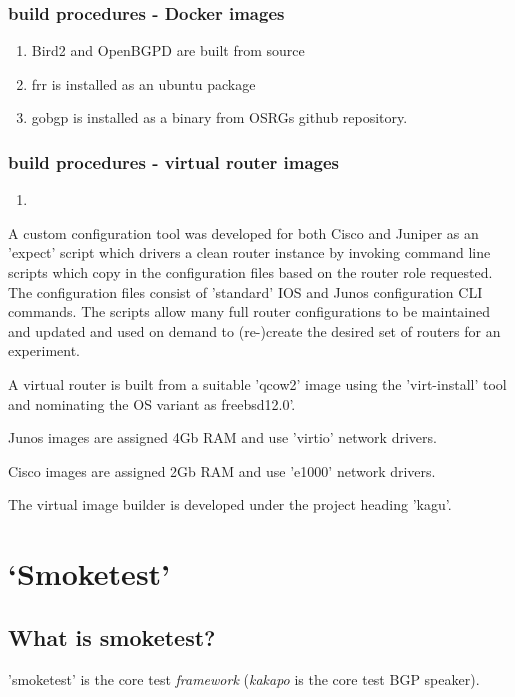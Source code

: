 \subsubsection{build procedures - Docker images}

\begin{enumerate}
\item Bird2 and OpenBGPD are built from source
\item frr is installed as an ubuntu package
\item gobgp is installed as a binary from OSRGs github repository.
\end{enumerate}

\subsubsection{build procedures - virtual router images}

\begin{enumerate}
\item <reference source file directory>
\end{enumerate}

A custom configuration tool was developed for both Cisco and Juniper as an 'expect' script which drivers a clean router instance by invoking command line scripts which copy in the configuration files based on the router role requested.  The configuration files consist of 'standard' IOS and Junos configuration CLI commands.
The scripts allow many full router configurations to be maintained and updated and used on demand to (re-)create the desired set of routers for an experiment.

A virtual router is built from a suitable 'qcow2' image using the 'virt-install' tool and nominating the OS variant as freebsd12.0'.

Junos images are assigned 4Gb RAM and use 'virtio' network drivers.

Cisco images are assigned 2Gb RAM and use 'e1000' network drivers.

The virtual image builder is developed under the project heading 'kagu'.


\NH{\rule{14cm}{0.4pt}}

\section{`Smoketest'}

\subsection*{What is smoketest?}
'smoketest' is the core test \textit{framework} (\textit{kakapo} is the core test BGP speaker).

